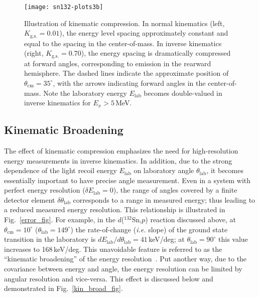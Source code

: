 \begin{figure}[ht]
\centering
\texttt{[image: sn132-plots3b]}
\caption[Illustration of kinematic compression]{Illustration of kinematic compression.  In normal kinematics (left, $K_\mathrm{g.s.}=0.01$), the energy level spacing approximately constant and equal to the spacing in the center-of-mass.  In inverse kinematics (right, $K_\mathrm{g.s.}=0.70$), the energy spacing is dramatically compressed at forward angles, corresponding to emission in the rearward hemisphere.  The dashed lines indicate the approximate position of $\theta_\mathrm{cm}=35^\circ$, with the arrows indicating forward angles in the center-of-mass.  Note the laboratory energy $E_\mathrm{lab}$ becomes double-valued in inverse kinematics for $E_x > 5$\,MeV.}%
\label{sn-plots}%
\end{figure}

\subsection{Kinematic Broadening}
\label{kin_broad}
The effect of kinematic compression emphasizes the need for high-resolution energy measurements in inverse kinematics.  In addition, due to the strong dependence of the light recoil energy $E_\mathrm{lab}$ on laboratory angle $\theta_\mathrm{lab}$, it becomes essentially important to have precise angle measurement.  %
Even in a system with perfect energy resolution ($\delta E_\mathrm{lab}=0$), the range of angles covered by a finite detector element $\delta \theta_\mathrm{lab}$ corresponds to a range in measured energy; thus leading to a reduced measured energy resolution.  This relationship is illustrated in Fig.~\ref{error_fig}.  For example, in the $d$($^{132}$Sn,$p$) reaction discussed above, at $\theta_\mathrm{cm}=10^\circ$ ($\theta_\mathrm{lab}=149^\circ$) the rate-of-change (\textit{i.e.} slope) of the ground state transition in the laboratory is $dE_\mathrm{lab}/d\theta_\mathrm{lab}=41$\,keV/deg; at $\theta_\mathrm{lab}=90^\circ$ this value increases to 168\,keV/deg.  This unavoidable feature is referred to as the ``kinematic broadening'' of the %
 energy resolution~\cite{Winfield_1997}.  Put another way, due to the covariance between energy and angle, the energy resolution %
 can be limited by angular resolution and vice-versa.  This effect is discussed below and demonstrated in Fig.~\ref{kin_broad_fig}.
 
